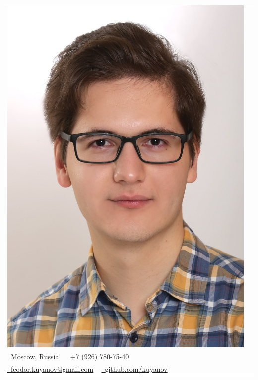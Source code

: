 \documentclass[letterpaper,11pt]{article}
\begin{document}
\begin{tabular}{l c}
	\begin{minipage}{0.15\textwidth}
		\includegraphics[width=\textwidth]{25.11.23-2.jpg}
	\end{minipage} &
	\begin{minipage}{0.85\textwidth}
		\begin{center}
			\vspace{15pt}
			{\Huge \scshape Fedor Kuyanov} \\ 
			\vspace{15pt}
			\small \raisebox{-0.1\height}\faHome\ Moscow, Russia ~ 
			\small \raisebox{-0.1\height}\faPhone\ +7 (926) 780-75-40 ~ \\
			\vspace{5pt}
			\href{mailto:feodor.kuyanov@gmail.com}{\raisebox{-0.2\height}\faEnvelope\  \underline{feodor.kuyanov@gmail.com}} ~ 
			\href{https://github.com/kuyanov}{\raisebox{-0.2\height}\faGithub\ \underline{github.com/kuyanov}}
		\end{center}
	\end{minipage}
\end{tabular}
\end{document}
